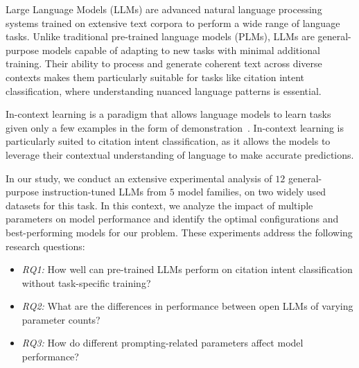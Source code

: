 Large Language Models (LLMs) are advanced natural language processing systems trained on extensive text corpora to perform a wide range of language tasks. Unlike traditional pre-trained language models (PLMs), LLMs are general-purpose models capable of adapting to new tasks with minimal additional training. Their ability to process and generate coherent text across diverse contexts makes them particularly suitable for tasks like citation intent classification, where understanding nuanced language patterns is essential.

In-context learning is a paradigm that allows language models to learn tasks given only a few examples in the form of demonstration~\citep{BMR2020, icl-survey}. In-context learning is particularly suited to citation intent classification, as it allows the models to leverage their contextual understanding of language to make accurate predictions.

In our study, we conduct an extensive experimental analysis of $12$ general-purpose instruction-tuned LLMs from $5$ model families,  on two widely used datasets for this task. In this context, we analyze the impact of multiple parameters on model performance and identify the optimal configurations and best-performing models for our problem. These experiments address the following research questions: 

\begin{itemize}[nosep,topsep=1pt]
    \item \textit{RQ1:} How well can pre-trained LLMs perform on citation intent classification without task-specific training? 
    \item \textit{RQ2:} What are the differences in performance between open LLMs of varying parameter counts?
    \item \textit{RQ3:} How do different prompting-related parameters affect model performance? 
\end{itemize}


